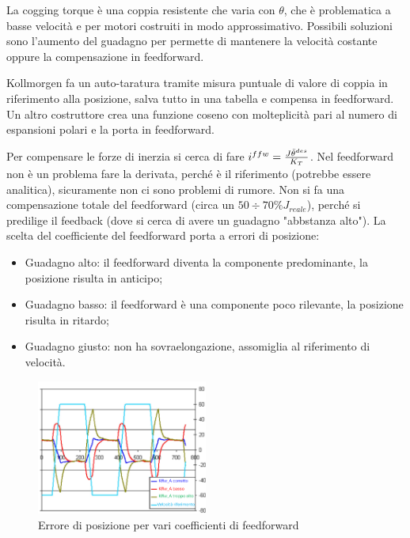 La cogging torque è una coppia resistente che varia con \(\theta\), che è problematica a basse velocità e per motori costruiti in modo approssimativo. Possibili soluzioni sono l'aumento del guadagno per permette di mantenere la velocità costante oppure la compensazione in feedforward.

Kollmorgen fa un auto-taratura tramite misura puntuale di valore di coppia in riferimento alla posizione, salva tutto in una tabella e compensa in feedforward.
Un altro costruttore crea una funzione coseno con molteplicità pari al numero di espansioni polari e la porta in feedforward.

Per compensare le forze di inerzia si cerca di fare \(i^{ffw}=\frac{J\Ddot{\theta}^{des}}{K_T}\). Nel feedforward non è un problema fare la derivata, perché è il riferimento (potrebbe essere analitica), sicuramente non ci sono problemi di rumore.
Non si fa una compensazione totale del feedforward (circa un \(50\div 70\% J_{reale}\)), perché si predilige il feedback (dove si cerca di avere un guadagno "abbstanza alto").
La scelta del coefficiente del feedforward porta a errori di posizione:
\begin{itemize}
    \item Guadagno alto: il feedforward diventa la componente predominante, la posizione risulta in anticipo;
    \item Guadagno basso: il feedforward è una componente poco rilevante, la posizione risulta in ritardo;
    \item Guadagno giusto: non ha sovraelongazione, assomiglia al riferimento di velocità.
\end{itemize}

\begin{figure}[h]
    \centering
    \includegraphics[width=0.5\textwidth]{Immagini/errore_posizione_feedforward.png}
    \caption{Errore di posizione per vari coefficienti di feedforward}
\end{figure}

